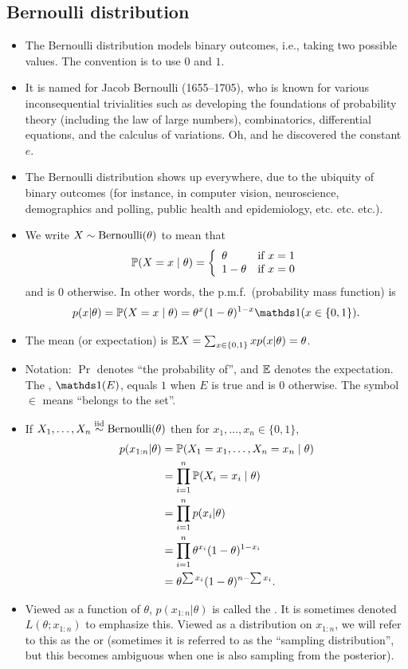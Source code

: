 \documentclass[12pt]{article}
\begin{document}
\subsection{Bernoulli distribution}
\begin{itemize}
\item The Bernoulli distribution models binary outcomes, i.e., taking two possible values. The convention is to use $0$ and $1$.
\item It is named for Jacob Bernoulli (1655--1705), who is known for various inconsequential trivialities such as developing the foundations of 
probability theory (including the law of large numbers), 
combinatorics,
differential equations, and
the calculus of variations.
Oh, and he discovered the constant $e$.
\item The Bernoulli distribution shows up everywhere, due to the ubiquity of binary outcomes (for instance, in computer vision, neuroscience, demographics and polling, public health and epidemiology, etc. etc. etc.).
\item We write $X\sim\Bernoulli(\theta)$ to mean that
$$\Pr(X = x\mid\theta) = \branch{\theta}{x = 1}{1-\theta}{x = 0}$$
and is $0$ otherwise.  In other words, the p.m.f.\ (probability mass function) is
$$ p(x|\theta) =\Pr(X = x\mid\theta) = \theta^x(1-\theta)^{1-x} \I(x\in\{0,1\}).$$
\item The mean (or expectation) is $\E X =\sum_{x\in\{0,1\}} x p(x|\theta) =\theta$.
\item Notation: $\Pr$ denotes ``the probability of'', and $\E$ denotes the expectation. The , $\I(E)$, equals $1$ when $E$ is true and is $0$ otherwise. The symbol $\in$ means ``belongs to the set''.
\item If $X_1,\dotsc,X_n\iid\Bernoulli(\theta)$ then for $x_1,\dotsc,x_n\in\{0,1\}$,
\begin{align}
p(x_{1:n}|\theta) &= \Pr(X_1 = x_1,\dotsc,X_n = x_n\mid\theta) \notag\\
& =\prod_{i = 1}^n \Pr(X_i = x_i\mid\theta) \notag\\
& = \prod_{i = 1}^n p(x_i|\theta) \notag\\
& =\prod_{i = 1}^n \theta^{x_i}(1-\theta)^{1-x_i} \notag\\
& =\theta^{\sum x_i}(1-\theta)^{n-\sum x_i}. \label{equation:likelihood}
\end{align}
\item Viewed as a function of $\theta$, $p(x_{1:n}|\theta)$ is called the . It is sometimes denoted $L(\theta; x_{1:n})$ to emphasize this. Viewed as a distribution on $x_{1:n}$, we will refer to this as the  or  (sometimes it is referred to as the ``sampling distribution'', but this becomes ambiguous when one is also sampling from the posterior).
\end{itemize}
\end{document}
